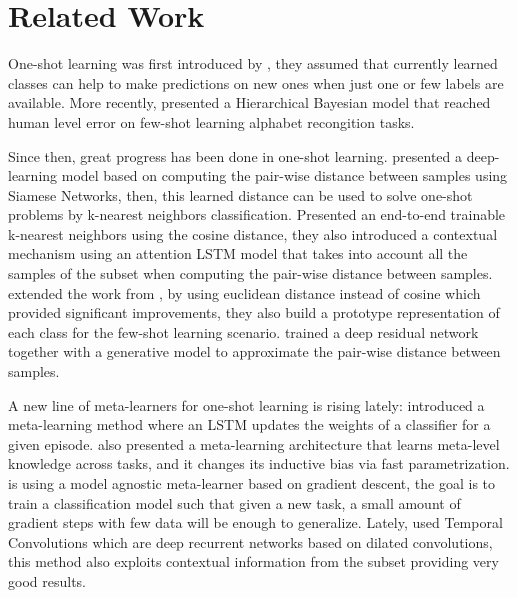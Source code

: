 \documentclass{article} \usepackage{iclr2018_conference,times}
\begin{document}
 \section{Related Work}
\label{relatedsec}
One-shot learning was first introduced by \cite{fei2006one}, they assumed that currently learned classes can help to make predictions on new ones when just one or few labels are available. More recently, \cite{lake2015human} presented a Hierarchical Bayesian model that reached human level error on few-shot learning alphabet recongition tasks.

Since then, great progress has been done in one-shot learning. \cite{koch2015siamese} presented a deep-learning model based on computing the pair-wise distance between samples using Siamese Networks, then, this learned distance can be used to solve one-shot problems by k-nearest neighbors classification.  \cite{vinyals2016matching} Presented an end-to-end trainable k-nearest neighbors using the cosine distance, they also introduced a contextual mechanism using an attention LSTM model that takes into account all the samples of the subset  when computing the pair-wise distance between samples. \cite{snell2017prototypical} extended the work from \cite{vinyals2016matching}, by using euclidean distance instead of cosine which provided significant improvements, they also build a prototype representation of each class for the few-shot learning scenario. \cite{mehrotra2017generative} trained a deep residual network together with a generative model to approximate the pair-wise distance between samples. 

A new line of meta-learners for one-shot learning is rising lately:  \cite{ravi2016optimization} introduced a meta-learning method where an LSTM updates the weights of a classifier for a given episode. \cite{munkhdalai2017meta} also presented a meta-learning architecture that learns meta-level knowledge across tasks, and it changes its inductive bias via fast parametrization. \cite{finn2017model} is using a model agnostic meta-learner based on gradient descent, the goal is to train a classification model such that given a new task, a small amount of gradient steps with few data will be enough to generalize. Lately,  \cite{mishra2017meta} used Temporal Convolutions which are deep recurrent networks based on dilated convolutions, this method also exploits contextual information from the subset  providing very good results.
\end{document}
